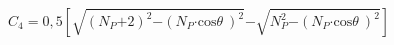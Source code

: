 \begin{equation}
\label{eqn:somelabel}
C_{\mathrm{4}}\mathrm{=0,5}\left[\sqrt{{\left(N_P\mathrm{+2}\right)}^{\mathrm{2}}\mathrm{-}{\left(N_P\mathrm{\cdot }{\mathrm{cos} \theta \ }\right)}^{\mathrm{2}}}\mathrm{-}\sqrt{N^{\mathrm{2}}_P\mathrm{-}{\left(N_P\mathrm{\cdot }{\mathrm{cos} \theta \ }\right)}^{\mathrm{2}}}\right]
\end{equation}